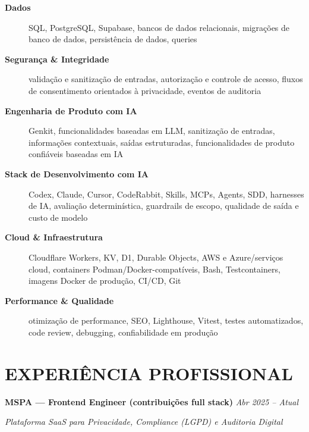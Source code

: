 \documentclass[10pt,a4paper]{article}
\begin{document}
\begin{description}
    \item[\textbf{Dados}]
    SQL, PostgreSQL, Supabase, bancos de dados relacionais,
    migrações de banco de dados, persistência de dados,
    queries

    \item[\textbf{Segurança \& Integridade}]
    validação e sanitização de entradas, autorização e controle de acesso,
    fluxos de consentimento orientados à privacidade, eventos de auditoria

    \item[\textbf{Engenharia de Produto com IA}]
    Genkit, funcionalidades baseadas em LLM,
    sanitização de entradas, informações contextuais,
    saídas estruturadas,
    funcionalidades de produto confiáveis baseadas em IA

    \item[\textbf{Stack de Desenvolvimento com IA}]
    Codex, Claude, Cursor, CodeRabbit, Skills,
    MCPs, Agents, SDD, harnesses de IA, avaliação determinística,
    guardrails de escopo, qualidade de saída e custo de modelo
    \vspace{12pt}

    \item[\textbf{Cloud \& Infraestrutura}]
    Cloudflare Workers, KV, D1, Durable Objects,
    AWS e Azure/serviços cloud, containers Podman/Docker-compatíveis,
    Bash, Testcontainers, imagens Docker de produção, CI/CD, Git

    \item[\textbf{Performance \& Qualidade}]
    otimização de performance, SEO, Lighthouse,
    Vitest, testes automatizados, code review,
    debugging, confiabilidade em produção

\end{description}


\section*{EXPERIÊNCIA PROFISSIONAL}

\noindent
\textbf{MSPA — Frontend Engineer (contribuições full stack)}
\hfill
\textit{Abr 2025 -- Atual}

\textit{Plataforma SaaS para Privacidade, Compliance (LGPD) e Auditoria Digital}
\end{document}
